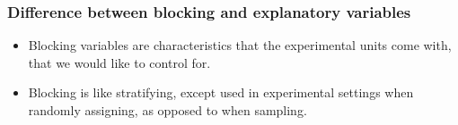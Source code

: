 \documentclass[slidestop,compress,mathserif]{beamer}
\begin{document}






\begin{frame}
	\frametitle{Difference between blocking and explanatory variables}

	\begin{itemize}
		\item Blocking variables are characteristics that the experimental units come with, that we would like to control for.
		\item Blocking is like stratifying, except used in experimental settings when randomly assigning, as opposed to when sampling.
	\end{itemize}

\end{frame}

\end{document}
